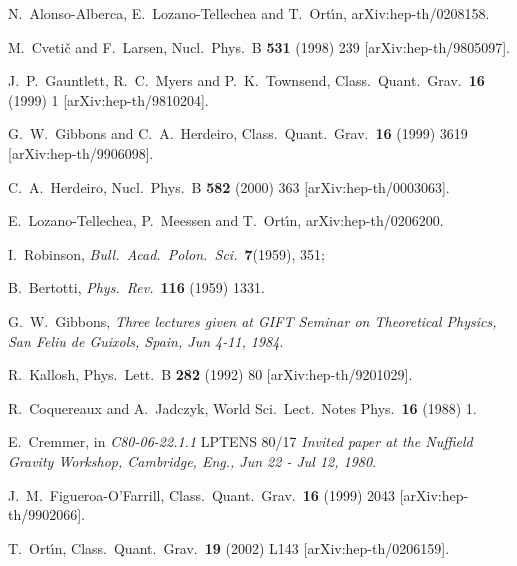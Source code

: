 \documentclass[12pt,a4paper]{article}
\begin{document}

\begin{thebibliography}{40}

N.~Alonso-Alberca, E.~Lozano-Tellechea and T.~Ort\'{\i}n,
arXiv:hep-th/0208158.

M.~Cveti\v{c} and F.~Larsen,
Nucl.\ Phys.\ B {\bf 531} (1998) 239
[arXiv:hep-th/9805097].

J.~P.~Gauntlett, R.~C.~Myers and P.~K.~Townsend,   
Class.\ Quant.\ Grav.\  {\bf 16} (1999) 1
[arXiv:hep-th/9810204].

G.~W.~Gibbons and C.~A.~Herdeiro,
Class.\ Quant.\ Grav.\  {\bf 16} (1999) 3619
[arXiv:hep-th/9906098].

C.~A.~Herdeiro,
Nucl.\ Phys.\ B {\bf 582} (2000) 363
[arXiv:hep-th/0003063].

E.~Lozano-Tellechea, P.~Meessen and T.~Ort\'{\i}n,
arXiv:hep-th/0206200.

 I.~Robinson,
                 {\it Bull.~Acad.~Polon.~Sci.}~\textbf{7}(1959), 351;
               
 B.~Bertotti,
                  {\it Phys.~Rev.}~\textbf{116} (1959) 1331.

G.~W.~Gibbons,
{\it Three lectures given at GIFT Seminar on Theoretical Physics, San Feliu de Guixols, Spain, Jun 4-11, 1984}.

R.~Kallosh,
Phys.\ Lett.\ B {\bf 282} (1992) 80
[arXiv:hep-th/9201029].


R.~Coquereaux and A.~Jadczyk,
World Sci.\ Lect.\ Notes Phys.\  {\bf 16} (1988) 1.

E.~Cremmer,
in {\it C80-06-22.1.1}
LPTENS 80/17
{\it Invited paper at the Nuffield Gravity Workshop, Cambridge, Eng., Jun 22 - Jul 12, 1980}.

J.~M.~Figueroa-O'Farrill,
Class.\ Quant.\ Grav.\  {\bf 16} (1999) 2043
[arXiv:hep-th/9902066].

T.~Ort\'{\i}n,
Class.\ Quant.\ Grav.\  {\bf 19} (2002) L143
[arXiv:hep-th/0206159].


\end{thebibliography}


\end{document}
